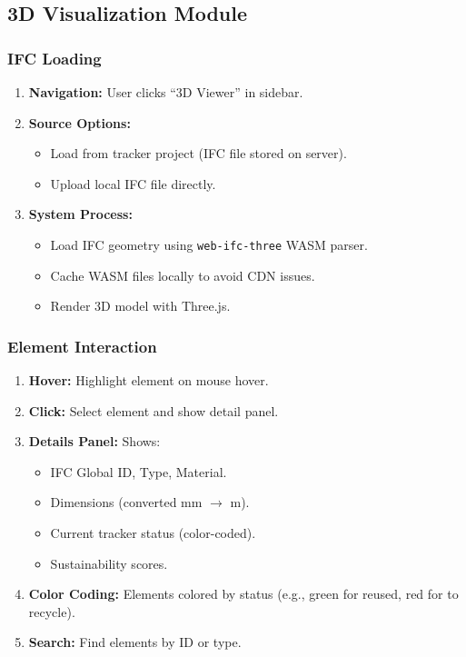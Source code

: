 \documentclass[11pt,a4paper]{article}
\begin{document}
\subsection{3D Visualization Module}

\subsubsection{IFC Loading}

\begin{enumerate}[leftmargin=*]
    \item \textbf{Navigation:} User clicks ``3D Viewer'' in sidebar.
    \item \textbf{Source Options:}
        \begin{itemize}
            \item Load from tracker project (IFC file stored on server).
            \item Upload local IFC file directly.
        \end{itemize}
    \item \textbf{System Process:} 
        \begin{itemize}
            \item Load IFC geometry using \texttt{web-ifc-three} WASM parser.
            \item Cache WASM files locally to avoid CDN issues.
            \item Render 3D model with Three.js.
        \end{itemize}
\end{enumerate}

\subsubsection{Element Interaction}

\begin{enumerate}[leftmargin=*]
    \item \textbf{Hover:} Highlight element on mouse hover.
    \item \textbf{Click:} Select element and show detail panel.
    \item \textbf{Details Panel:} Shows:
        \begin{itemize}
            \item IFC Global ID, Type, Material.
            \item Dimensions (converted mm $\rightarrow$ m).
            \item Current tracker status (color-coded).
            \item Sustainability scores.
        \end{itemize}
    \item \textbf{Color Coding:} Elements colored by status (e.g., green for reused, red for to recycle).
    \item \textbf{Search:} Find elements by ID or type.
\end{enumerate}
\end{document}
